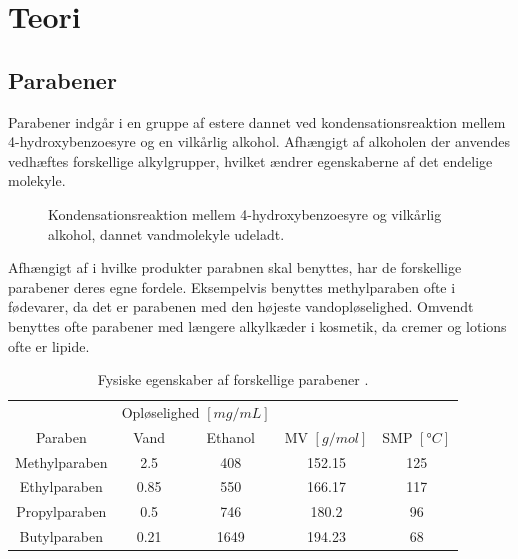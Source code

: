 \section{Teori}
    \subsection{Parabener}
    Parabener indgår i en gruppe af estere dannet ved kondensationsreaktion mellem 4-hydroxybenzoesyre og en vilkårlig alkohol. Afhængigt af alkoholen der anvendes vedhæftes forskellige alkylgrupper, hvilket ændrer egenskaberne af det endelige molekyle.
    \begin{figure}[H]
        \caption{Kondensationsreaktion mellem 4-hydroxybenzoesyre og vilkårlig alkohol, dannet vandmolekyle udeladt.}
    \end{figure}
    Afhængigt af i hvilke produkter parabnen skal benyttes, har de forskellige parabener deres egne fordele. Eksempelvis benyttes methylparaben ofte i fødevarer, da det er parabenen med den højeste vandopløselighed. Omvendt benyttes ofte parabener med længere alkylkæder i kosmetik, da cremer og lotions ofte er lipide.
    \begin{table}[H]\centering
        \caption{Fysiske egenskaber af forskellige parabener \parencite{PubChem}.}
        \begin{tabular}{ccccc}
            \toprule
            & \multicolumn{2}{c}{Opløselighed $\left[\si{mg\per mL}\right]$} & & \\
            \cmidrule(r){2-3}
            Paraben & Vand & Ethanol & MV $\left[\si{g\per mol}\right]$ & SMP $\left[\si{\degree C}\right]$ \\
            \midrule
            Methylparaben & 2.5 & 408 & 152.15 & 125 \\
            Ethylparaben & 0.85 & 550 & 166.17 & 117 \\ 
            Propylparaben & 0.5 & 746 & 180.2 & 96 \\
            Butylparaben & 0.21 & 1649 & 194.23 & 68 \\
            \bottomrule
        \end{tabular}
    \end{table}
